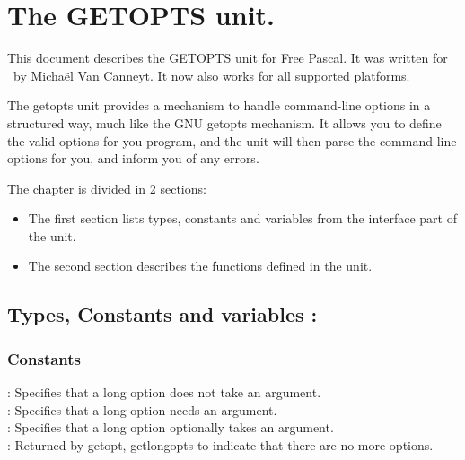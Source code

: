 %
%
%
%
%
\chapter{The GETOPTS unit.}
This document describes the GETOPTS unit for Free Pascal. It was written for
\linux\ by Micha\"el Van Canneyt. It now also works for all supported platforms.

The getopts unit provides a mechanism to handle command-line options in
a structured way, much like the GNU getopts mechanism. It allows you to
define the valid options for you program, and the unit will then parse the
command-line options for you, and inform you of any errors.

The chapter is divided in 2 sections:
\begin{itemize}
\item The first section lists types, constants and variables from the
interface part of the unit.
\item The second section describes the functions defined in the unit.
\end{itemize}
\section {Types, Constants and variables : }
\subsection{Constants}
 : Specifies that a long option does not take an
argument. \\
 : Specifies that a long option needs an
argument. \\
 : Specifies that a long option optionally takes an
argument. \\
  : Returned by getopt, getlongopts to indicate that
there are no more options.
